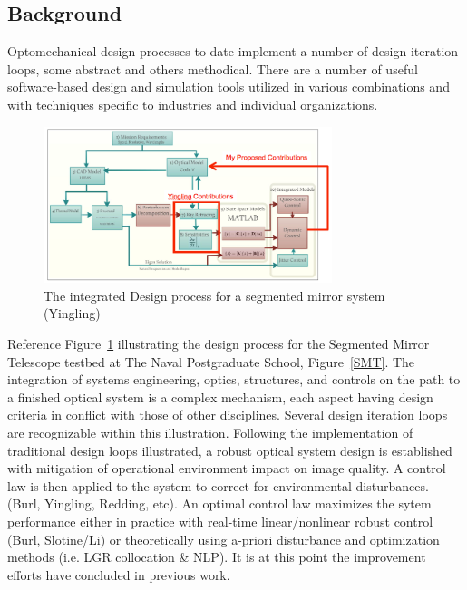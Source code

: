 \documentclass{aiaa-tc}
\begin{document}
\subsection{Background}

Optomechanical design processes to date implement a number of design iteration loops, some abstract and others methodical. There are a number of useful software-based design and simulation tools utilized in various combinations and with techniques specific to industries and individual organizations.

\begin{figure}[htb]	%
 \centering
 \includegraphics[width=0.75\textwidth]{Figures/Yingling_IntegratedDesignProcess}
 \caption{The integrated Design process for a segmented mirror system (Yingling)}
 \label{YingDesignProcess}
\end{figure}

Reference Figure~\ref{YingDesignProcess} illustrating the design process for the Segmented Mirror Telescope testbed at The Naval Postgraduate School, Figure~\ref{SMT}. The integration of systems engineering, optics, structures, and controls on the path to a finished optical system is a complex mechanism, each aspect having design criteria in conflict with those of other disciplines. Several design iteration loops are recognizable within this illustration. Following the implementation of traditional design loops illustrated, a robust optical system design is established with mitigation of operational environment impact on image quality. A control law is then applied to the system to correct for environmental disturbances. (Burl, Yingling, Redding, etc). An optimal control law maximizes the sytem performance either in practice with real-time linear/nonlinear robust control (Burl, Slotine/Li) or theoretically using a-priori disturbance and optimization methods (i.e. LGR collocation \& NLP). It is at this point the improvement efforts have concluded in previous work.
\end{document}
